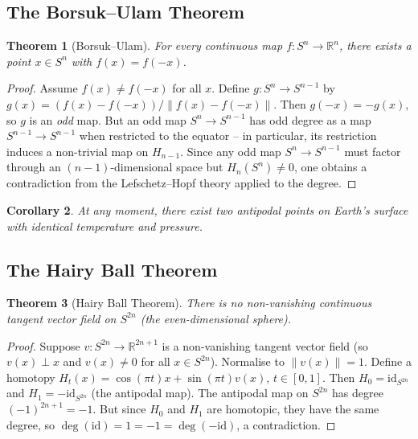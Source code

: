 \documentclass[12pt,a4paper]{amsart}
\newtheorem{theorem}{Theorem}[section]
\newtheorem{corollary}[theorem]{Corollary}
\theoremstyle{definition}
\begin{document}
\subsection{The Borsuk--Ulam Theorem}

\begin{theorem}[Borsuk--Ulam]
\label{thm:borsuk_ulam}
For every continuous map $f\colon S^n \to \mathbb{R}^n$, there exists a point
$x \in S^n$ with $f(x) = f(-x)$.
\end{theorem}
\begin{proof}
Assume $f(x) \neq f(-x)$ for all $x$. Define
$g\colon S^n \to S^{n-1}$ by $g(x) = (f(x) - f(-x)) / \|f(x) - f(-x)\|$.
Then $g(-x) = -g(x)$, so $g$ is an \emph{odd} map.
But an odd map $S^n \to S^{n-1}$ has odd degree as a map $S^{n-1} \to S^{n-1}$
when restricted to the equator -- in particular, its restriction induces a
non-trivial map on $H_{n-1}$. Since any odd map $S^n \to S^{n-1}$ must factor
through an $(n-1)$-dimensional space but $H_n(S^n) \neq 0$, one obtains a
contradiction from the Lefschetz--Hopf theory applied to the degree.
\end{proof}

\begin{corollary}
At any moment, there exist two antipodal points on Earth's surface with identical
temperature and pressure.
\end{corollary}

\subsection{The Hairy Ball Theorem}

\begin{theorem}[Hairy Ball Theorem]
\label{thm:hairy_ball}
There is no non-vanishing continuous tangent vector field on $S^{2n}$
(the even-dimensional sphere).
\end{theorem}
\begin{proof}
Suppose $v\colon S^{2n} \to \mathbb{R}^{2n+1}$ is a non-vanishing tangent
vector field (so $v(x) \perp x$ and $v(x) \neq 0$ for all $x \in S^{2n}$).
Normalise to $\|v(x)\| = 1$. Define a homotopy
$H_t(x) = \cos(\pi t) x + \sin(\pi t) v(x)$, $t \in [0,1]$.
Then $H_0 = \mathrm{id}_{S^{2n}}$ and $H_1 = -\mathrm{id}_{S^{2n}}$ (the antipodal map).
The antipodal map on $S^{2n}$ has degree $(-1)^{2n+1} = -1$.
But since $H_0$ and $H_1$ are homotopic, they have the same degree,
so $\deg(\mathrm{id}) = 1 = -1 = \deg(-\mathrm{id})$, a contradiction.
\end{proof}
\end{document}
